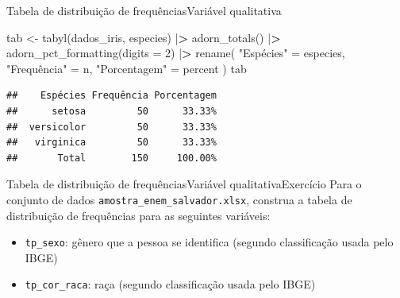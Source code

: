 \documentclass[
  10pt,
  ignorenonframetext,
]{beamer}
\newenvironment{Shaded}{}{}
\newcommand{\DataTypeTok}[1]{#1}
\newcommand{\DecValTok}[1]{#1}
\newcommand{\ErrorTok}[1]{\textcolor[rgb]{1.00,0.00,0.00}{\textbf{#1}}}
\newcommand{\KeywordTok}[1]{\textcolor[rgb]{0.00,0.00,1.00}{#1}}
\newcommand{\NormalTok}[1]{#1}
\newcommand{\OperatorTok}[1]{#1}
\newcommand{\StringTok}[1]{\textcolor[rgb]{0.00,0.50,0.50}{#1}}
\providecommand{\tightlist}{%
  \setlength{\itemsep}{0pt}\setlength{\parskip}{0pt}}
\begin{document}
\begin{frame}[fragile]{Tabela de distribuição de
frequências\newline Variável qualitativa}
\protect\hypertarget{tabela-de-distribuiuxe7uxe3o-de-frequuxeanciasvariuxe1vel-qualitativa-1}{}
\begin{Shaded}
\begin{Highlighting}[]
\NormalTok{tab \textless{}{-}}\StringTok{ }\KeywordTok{tabyl}\NormalTok{(dados\_iris, especies)  }\OperatorTok{|}\ErrorTok{\textgreater{}}
\StringTok{  }\KeywordTok{adorn\_totals}\NormalTok{()  }\OperatorTok{|}\ErrorTok{\textgreater{}}
\StringTok{  }\KeywordTok{adorn\_pct\_formatting}\NormalTok{(}\DataTypeTok{digits =} \DecValTok{2}\NormalTok{) }\OperatorTok{|}\ErrorTok{\textgreater{}}
\StringTok{  }\KeywordTok{rename}\NormalTok{(}
    \StringTok{"Espécies"}\NormalTok{ =}\StringTok{ }\NormalTok{especies, }\StringTok{"Frequência"}\NormalTok{ =}\StringTok{ }\NormalTok{n,}
    \StringTok{"Porcentagem"}\NormalTok{ =}\StringTok{ }\NormalTok{percent}
\NormalTok{  )}
\NormalTok{tab}
\end{Highlighting}
\end{Shaded}

\begin{verbatim}
##    Espécies Frequência Porcentagem
##      setosa         50      33.33%
##  versicolor         50      33.33%
##   virginica         50      33.33%
##       Total        150     100.00%
\end{verbatim}
\end{frame}

\begin{frame}[fragile]{Tabela de distribuição de
frequências\newline Variável qualitativa\newline Exercício}
\protect\hypertarget{tabela-de-distribuiuxe7uxe3o-de-frequuxeanciasvariuxe1vel-qualitativaexercuxedcio}{}
Para o conjunto de dados \texttt{amostra\_enem\_salvador.xlsx}, construa
a tabela de distribuição de frequências para as seguintes variáveis:

\begin{itemize}
\tightlist
\item
  \texttt{tp\_sexo}: gênero que a pessoa se identifica (segundo
  classificação usada pelo IBGE)
\item
  \texttt{tp\_cor\_raca}: raça (segundo classificação usada pelo IBGE)
\end{itemize}
\end{frame}
\end{document}
